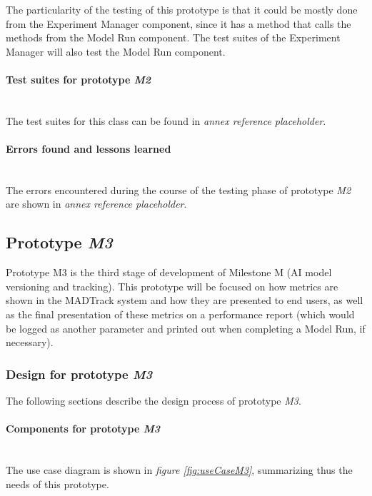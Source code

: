 The particularity of the testing of this prototype is that it could be mostly done from the Experiment Manager component, since it has a method that calls the methods
from the Model Run component. The test suites of the Experiment Manager will also test the Model Run component.

\paragraph{Test suites for prototype \emph{M2}}\mbox{}\\

The test suites for this class can be found in \emph{annex reference placeholder}.

\paragraph{Errors found and lessons learned}\mbox{}\\

The errors encountered during the course of the testing phase of prototype \emph{M2} are shown in \emph{annex reference placeholder}.

\subsection{Prototype \emph{M3}}

Prototype M3 is the third stage of development of Milestone M (AI model versioning and tracking). This prototype will be focused on how metrics are shown in the
MADTrack system and how they are presented to end users, as well as the final presentation of these metrics on a performance report (which would be logged as 
another parameter and printed out when completing a Model Run, if necessary).

\subsubsection{Design for prototype \emph{M3}}

The following sections describe the design process of prototype \emph{M3}.

\paragraph{Components for prototype \emph{M3}} \mbox{}\\

The use case diagram is shown in \emph{figure \ref{fig:useCaseM3}}, summarizing thus the needs of this prototype.

